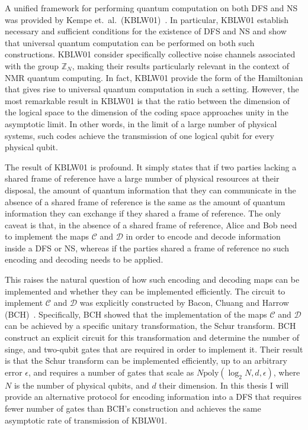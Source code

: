 A unified framework for performing quantum computation on both DFS and NS was provided by Kempe et.~al.~(KBLW01)~\cite{KBLW01}.  In particular, KBLW01 establish necessary and sufficient conditions for the existence of DFS and NS and show that universal quantum computation can be performed on both such constructions. KBLW01 consider specifically collective noise channels associated with the group $\mathbb{Z}_N$, making their results particularly relevant in the context of NMR quantum computing.  In fact, KBLW01 provide the form of the Hamiltonian that gives rise to universal quantum computation in such a setting.  However, the most remarkable result in KBLW01 is that the ratio between the dimension of the logical space  to the dimension of the coding space approaches unity in the asymptotic limit.  In other words, in the limit of a large number of physical systems, such codes achieve the transmission of one logical qubit for every physical qubit.

The result of KBLW01 is profound.  It simply states that if two parties lacking a shared frame of reference have a large number of physical resources at their disposal, the amount of quantum information that they can communicate in the absence of a shared frame of reference is the same as the amount of quantum information they can exchange if they shared a frame of reference.  The only caveat is that, in the absence of a shared frame of reference, Alice and Bob need to implement the maps $\mathcal{C}$ and $\mathcal{D}$ in order to encode and decode information inside a DFS or NS, whereas if the parties shared a frame of reference no such encoding and decoding needs to be applied.

This raises the natural question of how such encoding and decoding maps can be implemented and whether they can be implemented efficiently. The circuit to implement $\mathcal{C}$ and $\mathcal{D}$ was explicitly constructed by Bacon, Chuang and Harrow (BCH)~\cite{BCH06a, BCH06b}.  Specifically, BCH showed that the implementation of the maps $\mathcal{C}$ and $\mathcal{D}$ can be achieved by a specific unitary transformation,  the Schur transform. BCH construct an explicit circuit for this transformation and determine the number of singe, and two-qubit gates that are required in order to implement it.  Their result is that the Schur transform can be implemented efficiently, up to an arbitrary error $\epsilon$, and requires a number of gates that scale as $N\mathrm{poly}(\log_2 N, d, \epsilon)$, where $N$ is the number of physical qubits, and $d$ their dimension.  In this thesis I will provide an alternative protocol for encoding information into a DFS that requires fewer number of gates than BCH's construction and achieves the same asymptotic rate of transmission of KBLW01.

